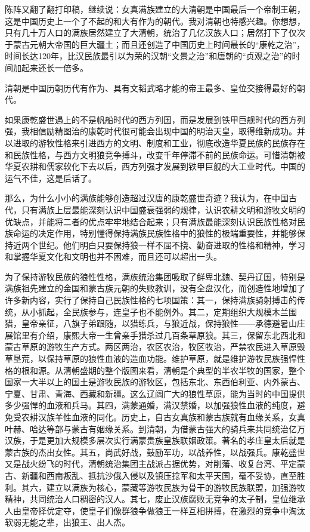 \par 
\par 陈阵又翻了翻打印稿，继续说：女真满族建立的大清朝是中国最后一个帝制王朝，这是中国历史上一个了不起的和大有作为的朝代。我对清朝也特感兴趣。你想想，只有几十万人口的满族居然建立了大清朝，统治了几亿汉族人口；居然打下了仅次于蒙古元朝大帝国的巨大疆土；而且还创造了中国历史上时间最长的“康乾之治”，时间长达120年，比汉民族最引以为荣的汉朝“文景之治”和唐朝的“贞观之治”的时间加起来还长一倍多。
\par 清朝是中国历朝历代有作为、具有文韬武略才能的帝王最多、皇位交接得最好的朝代。
\par 如果康乾盛世遇上的不是帆船时代的西方列国，而是发展到铁甲巨舰时代的西方列强，我相信励精图治的康乾时代很可能会出现中国的明治天皇，取得维新成功。并以进取的游牧性格来引进西方的文明、制度和工业，彻底改造华夏民族的民族存在和民族性格，与西方文明狼竞争搏斗，改变千年停滞不前的民族命运。可惜清朝被华夏农耕和儒家软化下去以后，西方列强才发展到铁甲巨舰的大工业时代。中国的运气不佳，这是后话了。
\par 那么，为什么小小的满族能够创造超过汉唐的康乾盛世奇迹？我认为，在中国古代，只有满族上层最能深刻认识中国盛衰强弱的规律，认识农耕文明和游牧文明的优缺点，并能将二者的优点牢牢地结合起来；只有满族最能深刻认识民族性格对民族命运的决定作用，特别懂得保持满族民族性格中的狼性的极端重要性，并能够保持近两个世纪。他们明白只要保持狼一样不屈不挠、勤奋进取的性格和精神，学习和掌握华夏文化和文明也并不困难，而且还可以超出一头。
\par 为了保持游牧民族的狼性性格，满族统治集团吸取了鲜卑北魏、契丹辽国，特别是满族祖先建立的金国和蒙古族元朝的失败教训，没有全盘汉化，而创造性地增加了许多新内容，实行了保持自己民族性格的七项国策：其一，保持满族骑射搏击的传统，从小抓起，全民族参与，连皇子也不能例外。其二，定期组织大规模木兰围猎，皇帝亲征，八旗子弟跟随，以猎练兵，与狼近战，保持狼性——承德避暑山庄展馆里有介绍，康熙大帝一生曾亲手猎杀过几百条草原狼。其三，保留东北西北和蒙古草原的游牧生产方式。两区两治，农区农治，牧区牧治，严禁农民进入草原毁草垦荒，以保持草原的狼性血液的造血功能。维护草原，就是维护游牧民族强悍性格的根和源。从清朝盛期的整个版图来看，清朝是个典型的半农半牧的国家，整个国家一大半以上的国土是游牧民族的游牧区，包括东北、东西伯利亚、内外蒙古、宁夏、甘肃、青海、西藏和新疆。这么辽阔广大的狼性草原，能为当时的中国提供多少强悍的血液和兵马。其四，满蒙通婚，满汉禁婚，以加强狼性血液的纯度，避免受农耕汉族羊性血液的同化。历史上，自古女真族和蒙古族就有血缘关系，女真叶赫、哈达等部与蒙古有姻缘关系。到清朝，为借蒙古强大的骑兵来共同统治亿万汉族，于是更加大规模多层次实行满蒙贵族皇族联姻政策。著名的孝庄皇太后就是蒙古族的杰出女性。其五，尚武好战，鼓励军功，以战养性，以战强兵。康乾盛世又是战火纷飞的时代，清朝统治集团主战派占据优势，对削藩、收复台湾、平定蒙古、新疆和西南叛乱、抵抗沙俄入侵以及镇压捻军和太平天国，毫不妥协，直至胜利。其六，建立以满族为核心，蒙藏等游牧民族为骨干的游牧民族联盟，加强游牧精神，共同统治人口稠密的汉人。其七，废止汉族腐败无竞争的太子制，皇位继承人由皇帝择优定夺，使皇子们像群狼争做狼王一样互相拼搏，在激烈的竞争中淘汰软弱无能之辈，出狼王、出人杰。
